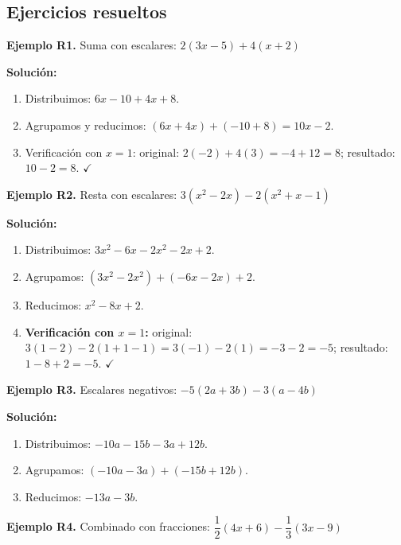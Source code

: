 \documentclass[12pt, letterpaper]{article}
\begin{document}
\subsection{Ejercicios resueltos}

\newpage %

\textbf{Ejemplo R1.} Suma con escalares: $2(3x - 5) + 4(x + 2)$

\begin{cuadrosolucion}
  \textbf{Solución:}
  \begin{enumerate}
    \item Distribuimos: $6x - 10 + 4x + 8$.
    \item Agrupamos y reducimos: $(6x + 4x) + (-10 + 8) = 10x - 2$.
    \item Verificación con $x = 1$: original: $2(-2) + 4(3) = -4 + 12 = 8$; resultado: $10 - 2 = 8$. $\checkmark$
  \end{enumerate}
\end{cuadrosolucion}

\textbf{Ejemplo R2.} Resta con escalares: $3(x^2 - 2x) - 2(x^2 + x - 1)$

\begin{cuadrosolucion}
  \textbf{Solución:}
  \begin{enumerate}
    \item Distribuimos: $3x^2 - 6x - 2x^2 - 2x + 2$.
    \item Agrupamos: $(3x^2 - 2x^2) + (-6x - 2x) + 2$.
    \item Reducimos: $x^2 - 8x + 2$.
    \item \textbf{Verificación con $x = 1$:} original: $3(1 - 2) - 2(1 + 1 - 1) = 3(-1) - 2(1) = -3 - 2 = -5$; resultado: $1 - 8 + 2 = -5$. $\checkmark$
  \end{enumerate}
\end{cuadrosolucion}

\textbf{Ejemplo R3.} Escalares negativos: $-5(2a + 3b) - 3(a - 4b)$

\begin{cuadrosolucion}
  \textbf{Solución:}
  \begin{enumerate}
    \item Distribuimos: $-10a - 15b - 3a + 12b$.
    \item Agrupamos: $(-10a - 3a) + (-15b + 12b)$.
    \item Reducimos: $-13a - 3b$.
  \end{enumerate}
\end{cuadrosolucion}

\textbf{Ejemplo R4.} Combinado con fracciones: $\dfrac{1}{2}(4x + 6) - \dfrac{1}{3}(3x - 9)$
\end{document}
